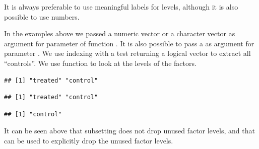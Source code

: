 \documentclass[krantz2]{krantz}\usepackage{knitr}%
\begin{document}
It is always preferable to use meaningful labels for levels, although it is also possible to use numbers.

In the examples above we passed a numeric vector or a character vector as argument for parameter  of function . It is also possible to pass a  as argument for parameter . We use indexing with a test returning a logical vector to extract all ``controls''. We use function  to look at the levels of the factors.

\begin{knitrout}\footnotesize
{}\color{fgcolor}\begin{kframe}
\begin{alltt}
\end{alltt}
\begin{verbatim}
## [1] "treated" "control"
\end{verbatim}
\begin{alltt}
 \hlkwb{<-} \hlstd{my.factor[my.factor} \hlopt{==} \hlstd{]}
\end{alltt}
\begin{verbatim}
## [1] "treated" "control"
\end{verbatim}
\begin{alltt}
 \hlkwb{<-} 
\end{alltt}
\begin{verbatim}
## [1] "control"
\end{verbatim}
\end{kframe}
\end{knitrout}

It can be seen above that subsetting does not drop unused factor levels, and that  can be used to explicitly drop the unused factor levels.
\end{document}

